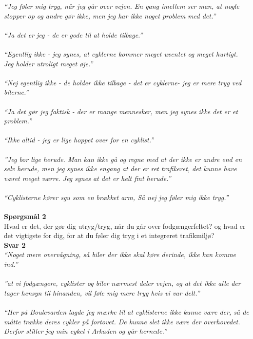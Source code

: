   \emph{“Jeg føler mig tryg, når jeg går over vejen. En gang imellem ser man, at nogle stopper op og andre gør ikke, men jeg har ikke noget problem med det.”}
~\\\\
  \emph{“Ja det er jeg - de er gode til at holde tilbage.”}
~\\\\
  \emph{“Egentlig ikke - jeg synes, at cyklerne kommer meget uventet og meget hurtigt. Jeg holder utroligt meget øje.”}
~\\\\
\emph{“Nej egentlig ikke - de holder ikke tilbage - det er cyklerne- jeg er mere tryg ved bilerne.”}
~\\\\
\emph{“Ja det gør jeg faktisk - der er mange mennesker, men jeg synes ikke det er et problem.”}
~\\\\
  \emph{“Ikke altid - jeg er lige hoppet over for en cyklist.”}
~\\\\
  \emph{”Jeg bor lige herude. Man kan ikke gå og regne med at der ikke er andre end en selv herude, men jeg synes ikke engang at der er ret trafikeret, det kunne have været meget værre. Jeg synes at det er helt fint herude.”}
~\\\\
  \emph{“Cyklisterne kører sgu som en brækket arm, Så nej jeg føler mig ikke tryg.”}
~\\\\
  \textbf{Spørgsmål 2}
  ~\\
  Hvad er det, der gør dig utryg/tryg, når du går over fodgængerfeltet? og hvad er det vigtigste for dig, for at du føler dig tryg i et integreret trafikmiljø?
~\\
  \textbf{Svar 2} ~\\
\emph{“Noget mere overvågning, så biler der ikke skal køre derinde, ikke kan komme ind.”}
~\\\\
  \emph{”at vi fodgængere, cyklister og biler nærmest deler vejen, og at det ikke alle der tager hensyn til hinanden, vil føle mig mere tryg hvis vi var delt.”}
~\\\\
  \emph{“Her på Boulevarden lagde jeg mærke til at cyklisterne ikke kunne være der, så de måtte trække deres cykler på fortovet. De kunne slet ikke være der overhovedet.  Derfor stiller jeg min cykel i Arkaden og går hernede.”}
~\\\\
